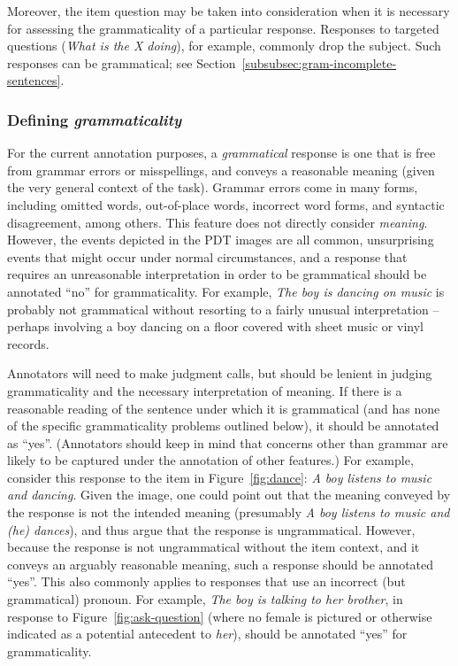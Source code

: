 \documentclass[12pt,notitlepage]{article}
\begin{document}
Moreover, the item question may be taken into consideration when it is necessary for assessing the grammaticality of a particular response. Responses to targeted questions (\textit{What is the X doing}), for example, commonly drop the subject. Such responses can be grammatical; see Section~\ref{subsubsec:gram-incomplete-sentences}.

\subsubsection{Defining \textit{grammaticality}} For the current annotation purposes, a \textit{grammatical} response is one that is free from grammar errors or misspellings, and conveys a reasonable meaning (given the very general context of the task). Grammar errors come in many forms, including omitted words, out-of-place words, incorrect word forms, and syntactic disagreement, among others. This feature does not directly consider \textit{meaning}. However, the events depicted in the PDT images are all common, unsurprising events that might occur under normal circumstances, and a response that requires an unreasonable interpretation in order to be grammatical should be annotated ``no'' for grammaticality. For example, \textit{The boy is dancing on music} is probably not grammatical without resorting to a fairly unusual interpretation -- perhaps involving a boy dancing on a floor covered with sheet music or vinyl records.

Annotators will need to make judgment calls, but should be lenient in judging grammaticality and the necessary interpretation of meaning. If there is a reasonable reading of the sentence under which it is grammatical (and has none of the specific grammaticality problems outlined below), it should be annotated as ``yes''. (Annotators should keep in mind that concerns other than grammar are likely to be captured under the annotation of other features.) For example, consider this response to the item in Figure~\ref{fig:dance}: \textit{A boy listens to music and dancing}. Given the image, one could point out that the meaning conveyed by the response is not the intended meaning (presumably \textit{A boy listens to music and (he) dances}), and thus argue that the response is ungrammatical. However, because the response is not ungrammatical without the item context, and it conveys an arguably reasonable meaning, such a response should be annotated ``yes''. This also commonly applies to responses that use an incorrect (but grammatical) pronoun. For example, \textit{The boy is talking to her brother}, in response to Figure~\ref{fig:ask-question} (where no female is pictured or otherwise indicated as a potential antecedent to \textit{her}), should be annotated ``yes'' for grammaticality.
\end{document}
